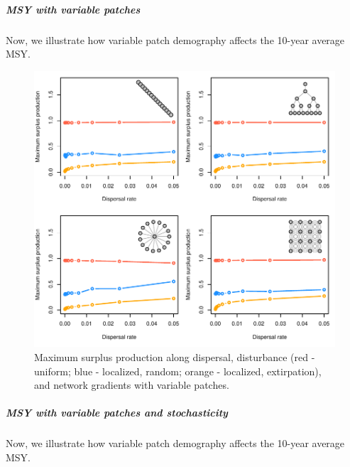 \documentclass[]{article}
\let\oldsubparagraph\subparagraph
\renewcommand{\subparagraph}[1]{\oldsubparagraph{#1}\mbox{}}
\begin{document}
\newpage

\hypertarget{msy-with-variable-patches}{%
\subparagraph{MSY with variable
patches}\label{msy-with-variable-patches}}

Now, we illustrate how variable patch demography affects the 10-year
average MSY.

\begin{figure}[H]

{\centering \includegraphics{Managing_for_ecological_surprises_in_metapopulations_makeHTML_files/figure-latex/MSY with variable patches-1} 

}

\caption{Maximum surplus production along dispersal, disturbance (red - uniform; blue - localized, random; orange - localized, extirpation), and network gradients with variable patches.}\label{fig:MSY with variable patches}
\end{figure}
\newpage

\hypertarget{msy-with-variable-patches-and-stochasticity}{%
\subparagraph{MSY with variable patches and
stochasticity}\label{msy-with-variable-patches-and-stochasticity}}

Now, we illustrate how variable patch demography affects the 10-year
average MSY.
\end{document}
